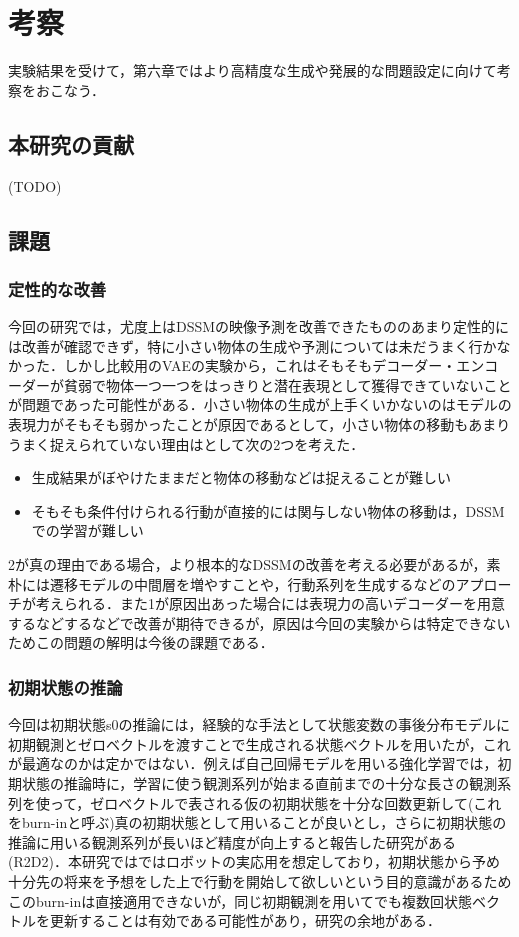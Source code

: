 \chapter{考察}
\label{chap:discussion}

実験結果を受けて，第六章ではより高精度な生成や発展的な問題設定に向けて考察をおこなう．

\section{本研究の貢献}
(TODO)

\section{課題}

\subsection{定性的な改善}
今回の研究では，尤度上はDSSMの映像予測を改善できたもののあまり定性的には改善が確認できず，特に小さい物体の生成や予測については未だうまく行かなかった．しかし比較用のVAEの実験から，これはそもそもデコーダー・エンコーダーが貧弱で物体一つ一つをはっきりと潜在表現として獲得できていないことが問題であった可能性がある．小さい物体の生成が上手くいかないのはモデルの表現力がそもそも弱かったことが原因であるとして，小さい物体の移動もあまりうまく捉えられていない理由はとして次の2つを考えた．
\begin{itemize}
    \item 生成結果がぼやけたままだと物体の移動などは捉えることが難しい
    \item そもそも条件付けられる行動が直接的には関与しない物体の移動は，DSSMでの学習が難しい
\end{itemize}
2が真の理由である場合，より根本的なDSSMの改善を考える必要があるが，素朴には遷移モデルの中間層を増やすことや，行動系列を生成するなどのアプローチが考えられる．また1が原因出あった場合には表現力の高いデコーダーを用意するなどするなどで改善が期待できるが，原因は今回の実験からは特定できないためこの問題の解明は今後の課題である．

\subsection{初期状態の推論}
今回は初期状態s0の推論には，経験的な手法として状態変数の事後分布モデルに初期観測とゼロベクトルを渡すことで生成される状態ベクトルを用いたが，これが最適なのかは定かではない．例えば自己回帰モデルを用いる強化学習では，初期状態の推論時に，学習に使う観測系列が始まる直前までの十分な長さの観測系列を使って，ゼロベクトルで表される仮の初期状態を十分な回数更新して(これをburn-inと呼ぶ)真の初期状態として用いることが良いとし，さらに初期状態の推論に用いる観測系列が長いほど精度が向上すると報告した研究がある(R2D2)．本研究ではではロボットの実応用を想定しており，初期状態から予め十分先の将来を予想をした上で行動を開始して欲しいという目的意識があるためこのburn-inは直接適用できないが，同じ初期観測を用いてでも複数回状態ベクトルを更新することは有効である可能性があり，研究の余地がある．


